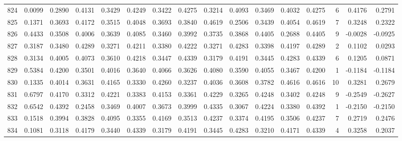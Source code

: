 \begin{tabular}{lrrrrrrrrrrrrrrr}
824 &      0.0099 &  0.2890 &  0.4131 &  0.3429 &  0.4249 &  0.3422 &  0.4275 &  0.3214 &  0.4093 &  0.3469 &   0.4032 &     0.4275 &      6 &                    0.4176 &                     0.2791 \\
825 &      0.1371 &  0.3693 &  0.4172 &  0.3515 &  0.4048 &  0.3693 &  0.3840 &  0.4619 &  0.2506 &  0.3439 &   0.4054 &     0.4619 &      7 &                    0.3248 &                     0.2322 \\
826 &      0.4433 &  0.3508 &  0.4006 &  0.3639 &  0.4085 &  0.3460 &  0.3992 &  0.3735 &  0.3868 &  0.4405 &   0.2688 &     0.4405 &      9 &                   -0.0028 &                    -0.0925 \\
827 &      0.3187 &  0.3480 &  0.4289 &  0.3271 &  0.4211 &  0.3380 &  0.4222 &  0.3271 &  0.4283 &  0.3398 &   0.4197 &     0.4289 &      2 &                    0.1102 &                     0.0293 \\
828 &      0.3134 &  0.4005 &  0.4073 &  0.3610 &  0.4218 &  0.3447 &  0.4339 &  0.3179 &  0.4191 &  0.3445 &   0.4283 &     0.4339 &      6 &                    0.1205 &                     0.0871 \\
829 &      0.5384 &  0.4200 &  0.3501 &  0.4016 &  0.3640 &  0.4066 &  0.3626 &  0.4080 &  0.3590 &  0.4055 &   0.3467 &     0.4200 &      1 &                   -0.1184 &                    -0.1184 \\
830 &      0.1335 &  0.4014 &  0.3631 &  0.4165 &  0.3330 &  0.4260 &  0.3237 &  0.4036 &  0.3608 &  0.3782 &   0.4616 &     0.4616 &     10 &                    0.3281 &                     0.2679 \\
831 &      0.6797 &  0.4170 &  0.3312 &  0.4221 &  0.3383 &  0.4153 &  0.3361 &  0.4229 &  0.3265 &  0.4248 &   0.3402 &     0.4248 &      9 &                   -0.2549 &                    -0.2627 \\
832 &      0.6542 &  0.4392 &  0.2458 &  0.3469 &  0.4007 &  0.3673 &  0.3999 &  0.4335 &  0.3067 &  0.4224 &   0.3380 &     0.4392 &      1 &                   -0.2150 &                    -0.2150 \\
833 &      0.1518 &  0.3994 &  0.3828 &  0.4095 &  0.3355 &  0.4169 &  0.3513 &  0.4237 &  0.3374 &  0.4195 &   0.3506 &     0.4237 &      7 &                    0.2719 &                     0.2476 \\
834 &      0.1081 &  0.3118 &  0.4179 &  0.3440 &  0.4339 &  0.3179 &  0.4191 &  0.3445 &  0.4283 &  0.3210 &   0.4171 &     0.4339 &      4 &                    0.3258 &                     0.2037 \\

\end{tabular}
